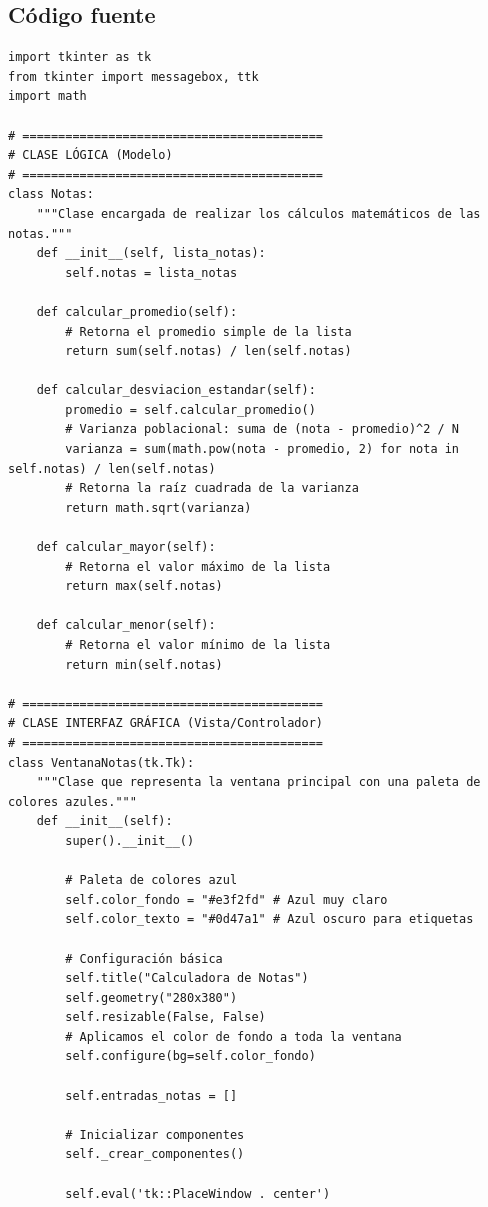 \documentclass[11pt, a4paper]{article}
\begin{document}
\subsection{Código fuente}
\begin{lstlisting}
import tkinter as tk
from tkinter import messagebox, ttk
import math

# ==========================================
# CLASE LÓGICA (Modelo)
# ==========================================
class Notas:
    """Clase encargada de realizar los cálculos matemáticos de las notas."""
    def __init__(self, lista_notas):
        self.notas = lista_notas

    def calcular_promedio(self):
        # Retorna el promedio simple de la lista
        return sum(self.notas) / len(self.notas)

    def calcular_desviacion_estandar(self):
        promedio = self.calcular_promedio()
        # Varianza poblacional: suma de (nota - promedio)^2 / N
        varianza = sum(math.pow(nota - promedio, 2) for nota in self.notas) / len(self.notas)
        # Retorna la raíz cuadrada de la varianza
        return math.sqrt(varianza)

    def calcular_mayor(self):
        # Retorna el valor máximo de la lista
        return max(self.notas)

    def calcular_menor(self):
        # Retorna el valor mínimo de la lista
        return min(self.notas)

# ==========================================
# CLASE INTERFAZ GRÁFICA (Vista/Controlador)
# ==========================================
class VentanaNotas(tk.Tk):
    """Clase que representa la ventana principal con una paleta de colores azules."""
    def __init__(self):
        super().__init__()
        
        # Paleta de colores azul
        self.color_fondo = "#e3f2fd" # Azul muy claro
        self.color_texto = "#0d47a1" # Azul oscuro para etiquetas
        
        # Configuración básica
        self.title("Calculadora de Notas")
        self.geometry("280x380")
        self.resizable(False, False)
        # Aplicamos el color de fondo a toda la ventana
        self.configure(bg=self.color_fondo)
        
        self.entradas_notas = []
        
        # Inicializar componentes
        self._crear_componentes()
        
        self.eval('tk::PlaceWindow . center')


\end{lstlisting}
\end{document}

